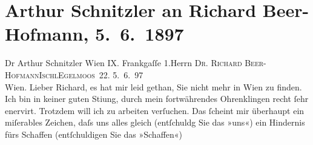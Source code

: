 

         
         \renewcommand{\erwaehntePersonen}{Personen: Richard Beer-Hofmann, Paula Beer-Hofmann, Georg Hirschfeld, Leopold Petter, Louise Schnitzler}
         \renewcommand{\erwaehnteOrte}{Orte: Bad Ischl, Eglmoosgasse, Frankgasse 1, Hotel und Pension Rudolfshöhe (Leopold Petter), I., Innere Stadt, Wien}
         \renewcommand{\erwaehnteWerke}{Werke: Agnes Jordan. Schauspiel in fünf Akten}
               \section[Arthur Schnitzler an Richard Beer-Hofmann, 5. 6. 1897]{ Arthur Schnitzler an Richard Beer-Hofmann, 5. 6. 1897}\nopagebreak{}\rehead{ }\begin{ledgroupsized}[t]{13cm}\normalsize\beginnumbering \toendnotes[C]{\smallbreak\pagebreak[2]} 
\toendnotes[C]{\smallbreak}\pstart{}{\pb}Dr Arthur Schnitzler Wien IX. Frankgaſſe 1.\pend{}{\bigskip}\pstart{}{\pb}Herrn \textsc{Dr. Richard
                     Beer-Hofmann}\pend{}\pstart{}\textsc{Ischl}\pend{}\pstart{}\textsc{Egelmoos 22}.\pend{}{\bigskip}\pstart
           \raggedleft{}{\pb}5. 6. 97{\\}Wien. \pend
           \pstart
           Lieber Richard, es hat mir leid gethan, Sie nicht mehr in Wien zu finden. Ich bin in keiner guten Sti{\geminationm}ung, durch mein fortwährendes Ohrenklingen recht ſehr
               enervirt. Trotzdem will ich zu arbeiten verſuchen. Das ſcheint mir überhaupt ein
               miſerables Zeichen, daſs uns alles gleich (entſchuldg Sie das »uns«) ein Hindernis
               fürs {\pb}Schaffen (entſchuldigen Sie das »Schaffen«)

\end{ledgroupsized}
